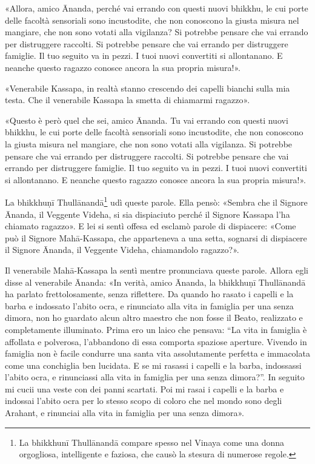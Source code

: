 «Allora, amico Ānanda, perché vai errando con questi nuovi bhikkhu, le cui porte
delle facoltà sensoriali sono incustodite, che non conoscono la giusta misura
nel mangiare, che non sono votati alla vigilanza? Si potrebbe pensare che vai
errando per distruggere raccolti. Si potrebbe pensare che vai errando per
distruggere famiglie. Il tuo seguito va in pezzi. I tuoi nuovi convertiti si
allontanano. E neanche questo ragazzo conosce ancora la sua propria misura!».

«Venerabile Kassapa, in realtà stanno crescendo dei capelli bianchi sulla mia
testa. Che il venerabile Kassapa la smetta di chiamarmi ragazzo».

«Questo è però quel che sei, amico Ānanda. Tu vai errando con questi nuovi
bhikkhu, le cui porte delle facoltà sensoriali sono incustodite, che non
conoscono la giusta misura nel mangiare, che non sono votati alla vigilanza. Si
potrebbe pensare che vai errando per distruggere raccolti. Si potrebbe pensare
che vai errando per distruggere famiglie. Il tuo seguito va in pezzi. I tuoi
nuovi convertiti si allontanano. E neanche questo ragazzo conosce ancora la sua
propria misura!».

La bhikkhuṇī Thullānandā\footnote{La bhikkhunī Thullānandā compare spesso nel
  Vinaya come una donna orgogliosa, intelligente e faziosa, che causò la stesura
  di numerose regole.} udì queste parole. Ella pensò: «Sembra che il Signore
Ānanda, il Veggente Videha, si sia dispiaciuto perché il Signore Kassapa l’ha
chiamato ragazzo». E lei si sentì offesa ed esclamò parole di dispiacere: «Come
può il Signore Mahā-Kassapa, che apparteneva a una setta, sognarsi di dispiacere
il Signore Ānanda, il Veggente Videha, chiamandolo ragazzo?».

Il venerabile Mahā-Kassapa la sentì mentre pronunciava queste parole. Allora
egli disse al venerabile Ānanda: «In verità, amico Ānanda, la bhikkhuṇī
Thullānandā ha parlato frettolosamente, senza riflettere. Da quando ho rasato i
capelli e la barba e indossato l’abito ocra, e rinunciato alla vita in famiglia
per una senza dimora, non ho guardato alcun altro maestro che non fosse il
Beato, realizzato e completamente illuminato. Prima ero un laico che pensava:
“La vita in famiglia è affollata e polverosa, l’abbandono di essa comporta
spaziose aperture. Vivendo in famiglia non è facile condurre una santa vita
assolutamente perfetta e immacolata come una conchiglia ben lucidata. E se mi
rasassi i capelli e la barba, indossassi l’abito ocra, e rinunciassi alla vita
in famiglia per una senza dimora?”. In seguito mi cucii una veste con dei panni
scartati. Poi mi rasai i capelli e la barba e indossai l’abito ocra per lo
stesso scopo di coloro che nel mondo sono degli Arahant, e rinunciai alla vita
in famiglia per una senza dimora».

